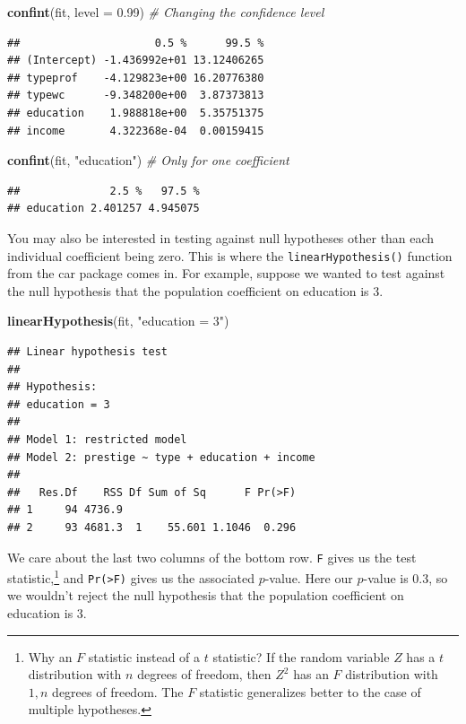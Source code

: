 \documentclass[
  12pt,
  oneside,openany]{book}
\newenvironment{Shaded}{\begin{snugshade}}{\end{snugshade}}
\newcommand{\CommentTok}[1]{\textcolor[rgb]{0.56,0.35,0.01}{\textit{#1}}}
\newcommand{\DataTypeTok}[1]{\textcolor[rgb]{0.13,0.29,0.53}{#1}}
\newcommand{\FloatTok}[1]{\textcolor[rgb]{0.00,0.00,0.81}{#1}}
\newcommand{\KeywordTok}[1]{\textcolor[rgb]{0.13,0.29,0.53}{\textbf{#1}}}
\newcommand{\NormalTok}[1]{#1}
\newcommand{\StringTok}[1]{\textcolor[rgb]{0.31,0.60,0.02}{#1}}
\begin{document}
\begin{Shaded}
\begin{Highlighting}[]
\KeywordTok{confint}\NormalTok{(fit, }\DataTypeTok{level =} \FloatTok{0.99}\NormalTok{)  }\CommentTok{\# Changing the confidence level}
\end{Highlighting}
\end{Shaded}

\begin{verbatim}
##                     0.5 %      99.5 %
## (Intercept) -1.436992e+01 13.12406265
## typeprof    -4.129823e+00 16.20776380
## typewc      -9.348200e+00  3.87373813
## education    1.988818e+00  5.35751375
## income       4.322368e-04  0.00159415
\end{verbatim}

\begin{Shaded}
\begin{Highlighting}[]
\KeywordTok{confint}\NormalTok{(fit, }\StringTok{"education"}\NormalTok{)   }\CommentTok{\# Only for one coefficient}
\end{Highlighting}
\end{Shaded}

\begin{verbatim}
##              2.5 %   97.5 %
## education 2.401257 4.945075
\end{verbatim}

You may also be interested in testing against null hypotheses other than each individual coefficient being zero. This is where the \texttt{linearHypothesis()} function from the car package comes in. For example, suppose we wanted to test against the null hypothesis that the population coefficient on education is 3.

\begin{Shaded}
\begin{Highlighting}[]
\KeywordTok{linearHypothesis}\NormalTok{(fit, }\StringTok{"education = 3"}\NormalTok{)}
\end{Highlighting}
\end{Shaded}

\begin{verbatim}
## Linear hypothesis test
## 
## Hypothesis:
## education = 3
## 
## Model 1: restricted model
## Model 2: prestige ~ type + education + income
## 
##   Res.Df    RSS Df Sum of Sq      F Pr(>F)
## 1     94 4736.9                           
## 2     93 4681.3  1    55.601 1.1046  0.296
\end{verbatim}

We care about the last two columns of the bottom row. \texttt{F} gives us the test statistic,\footnote{Why an \(F\) statistic instead of a \(t\) statistic? If the random variable \(Z\) has a \(t\) distribution with \(n\) degrees of freedom, then \(Z^2\) has an \(F\) distribution with \(1,n\) degrees of freedom. The \(F\) statistic generalizes better to the case of multiple hypotheses.} and \texttt{Pr(\textgreater{}F)} gives us the associated \(p\)-value. Here our \(p\)-value is 0.3, so we wouldn't reject the null hypothesis that the population coefficient on education is 3.
\end{document}
